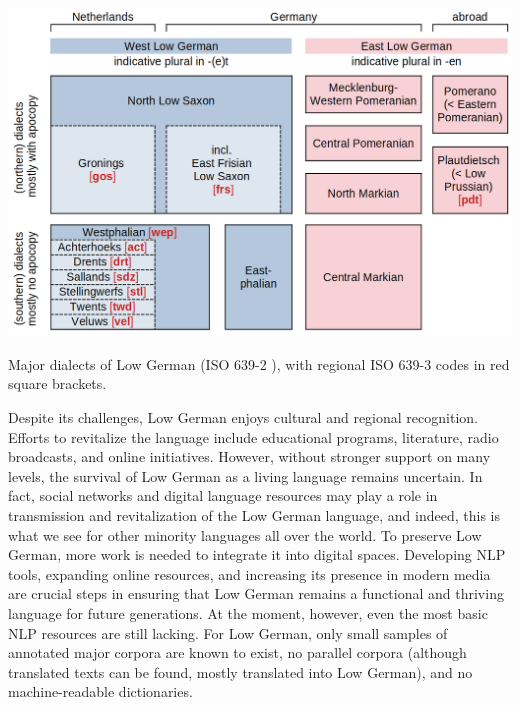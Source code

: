 \documentclass{article}
\begin{document}
\begin{table}
    \centering
    \includegraphics[width=0.8\linewidth]{dialects-and-iso632-codes.png}
    \caption{Major dialects of Low German (ISO 639-2 ), with regional ISO 639-3 codes in red square brackets.}
    \label{tab-dialects-and-isocodes}
\end{table}

Despite its challenges, Low German enjoys cultural and regional recognition. Efforts to revitalize the language include educational programs, literature, radio broadcasts, and online initiatives. However, without stronger support on many levels, the survival of Low German as a living language remains uncertain. In fact, social networks and digital language resources may play a role in transmission and revitalization of the Low German language, and indeed, this is what we see for other minority languages all over the world. 
To preserve Low German, more work is needed to integrate it into digital spaces. Developing NLP tools, expanding online resources, and increasing its presence in modern media are crucial steps in ensuring that Low German remains a functional and thriving language for future generations. At the moment, however, even the most basic NLP resources are still lacking. For Low German, only small samples of annotated major corpora are known to exist, no parallel corpora (although translated texts can be found, mostly translated into Low German), and no machine-readable dictionaries. 
\end{document}
